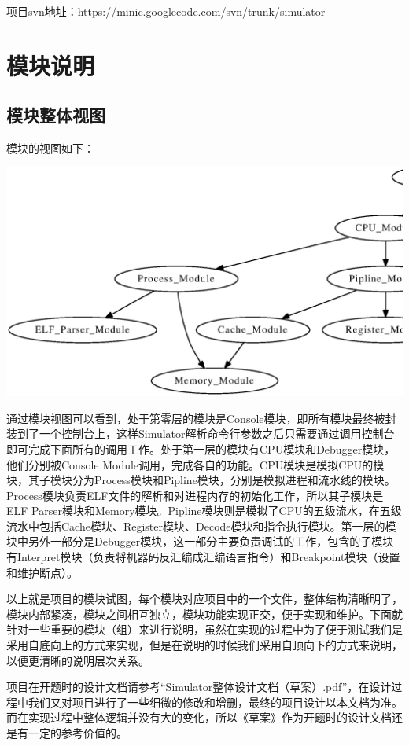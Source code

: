 \documentclass[12pt,a4paper]{article}
\begin{document}
项目svn地址：https://minic.googlecode.com/svn/trunk/simulator

\section{模块说明}

\subsection{模块整体视图}

模块的视图如下：

\noindent\includegraphics[width=14cm]{module_view.eps}

通过模块视图可以看到，处于第零层的模块是Console模块，即所有模块最终被封装到了一个控制台上，这样Simulator解析命令行参数之后只需要通过调用控制台即可完成下面所有的调用工作。处于第一层的模块有CPU模块和Debugger模块，他们分别被Console Module调用，完成各自的功能。CPU模块是模拟CPU的模块，其子模块分为Process模块和Pipline模块，分别是模拟进程和流水线的模块。Process模块负责ELF文件的解析和对进程内存的初始化工作，所以其子模块是ELF Parser模块和Memory模块。Pipline模块则是模拟了CPU的五级流水，在五级流水中包括Cache模块、Register模块、Decode模块和指令执行模块。第一层的模块中另外一部分是Debugger模块，这一部分主要负责调试的工作，包含的子模块有Interpret模块（负责将机器码反汇编成汇编语言指令）和Breakpoint模块（设置和维护断点）。

以上就是项目的模块试图，每个模块对应项目中的一个文件，整体结构清晰明了，模块内部紧凑，模块之间相互独立，模块功能实现正交，便于实现和维护。下面就针对一些重要的模块（组）来进行说明，虽然在实现的过程中为了便于测试我们是采用自底向上的方式来实现，但是在说明的时候我们采用自顶向下的方式来说明，以便更清晰的说明层次关系。

项目在开题时的设计文档请参考“Simulator整体设计文档（草案）.pdf”，在设计过程中我们又对项目进行了一些细微的修改和增删，最终的项目设计以本文档为准。而在实现过程中整体逻辑并没有大的变化，所以《草案》作为开题时的设计文档还是有一定的参考价值的。
\end{document}
